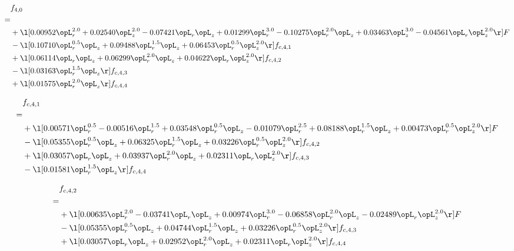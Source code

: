 \begin{alignat}{2} 
\label{eq:f_40_2} 
& f_{4,0} \nonumber \\ 
 = \\ 
& + \l[  0.00952 \opL_r^{2.0} +  0.02540 \opL_z^{2.0}   -0.07421 \opL_r \opL_z +  0.01299 \opL_r^{3.0}   -0.10275 \opL_r^{2.0} \opL_z +  0.03463 \opL_z^{3.0}   -0.04561 \opL_r \opL_z^{2.0}  \r] F \nonumber \\ 
& - \l[  0.10710 \opL_r^{0.5} \opL_z +  0.09488 \opL_r^{1.5} \opL_z +  0.06453 \opL_r^{0.5} \opL_z^{2.0}  \r] f_{c,4,1} \nonumber \\ 
& + \l[  0.06114 \opL_r \opL_z +  0.06299 \opL_r^{2.0} \opL_z +  0.04622 \opL_r \opL_z^{2.0}  \r] f_{c,4,2} \nonumber \\ 
& - \l[  0.03163 \opL_r^{1.5} \opL_z  \r] f_{c,4,3} \nonumber \\ 
& + \l[  0.01575 \opL_r^{2.0} \opL_z  \r] f_{c,4,4} \nonumber \\ 
\end{alignat} 


\begin{alignat}{2} 
\label{eq:f_41_2} 
& f_{c,4,1} \nonumber \\ 
 = \\ 
& + \l[  0.00571 \opL_r^{0.5}   -0.00516 \opL_r^{1.5} +  0.03548 \opL_r^{0.5} \opL_z   -0.01079 \opL_r^{2.5} +  0.08188 \opL_r^{1.5} \opL_z +  0.00473 \opL_r^{0.5} \opL_z^{2.0}  \r] F \nonumber \\ 
& - \l[  0.05355 \opL_r^{0.5} \opL_z +  0.06325 \opL_r^{1.5} \opL_z +  0.03226 \opL_r^{0.5} \opL_z^{2.0}  \r] f_{c,4,2} \nonumber \\ 
& + \l[  0.03057 \opL_r \opL_z +  0.03937 \opL_r^{2.0} \opL_z +  0.02311 \opL_r \opL_z^{2.0}  \r] f_{c,4,3} \nonumber \\ 
& - \l[  0.01581 \opL_r^{1.5} \opL_z  \r] f_{c,4,4} \nonumber \\ 
\end{alignat} 


\begin{alignat}{2} 
\label{eq:f_42_2} 
& f_{c,4,2} \nonumber \\ 
 = \\ 
& + \l[  0.00635 \opL_r^{2.0}   -0.03741 \opL_r \opL_z +  0.00974 \opL_r^{3.0}   -0.06858 \opL_r^{2.0} \opL_z   -0.02489 \opL_r \opL_z^{2.0}  \r] F \nonumber \\ 
& - \l[  0.05355 \opL_r^{0.5} \opL_z +  0.04744 \opL_r^{1.5} \opL_z +  0.03226 \opL_r^{0.5} \opL_z^{2.0}  \r] f_{c,4,3} \nonumber \\ 
& + \l[  0.03057 \opL_r \opL_z +  0.02952 \opL_r^{2.0} \opL_z +  0.02311 \opL_r \opL_z^{2.0}  \r] f_{c,4,4} \nonumber \\ 
\end{alignat} 


